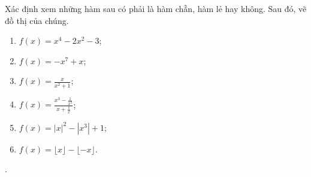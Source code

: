 \exercise Xác định xem những hàm sau có phải là hàm chẵn, hàm lẻ hay không. Sau đó, vẽ đồ thị của chúng.
\begin{multicols}{2}
   \begin{enumerate}
      \item $f(x) = x^4 - 2x^2 - 3$;
      \item $f(x) = -x^7 + x$;
      \item $f(x) = \frac{x}{x^2 + 1}$;
      \item $f(x) = \frac{x^3 - \frac{1}{x^3}}{x + \frac{1}{x}}$;
      \item $f(x) = |x|^2 - \left|x^3\right| + 1$;
      \item $f(x) = \lfloor x \rfloor - \lfloor -x \rfloor$.
   \end{enumerate}
\end{multicols}

\solution 

\setcounter{subexercise}{1}
. 